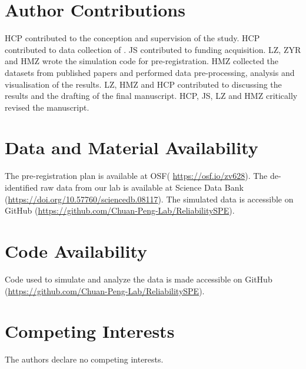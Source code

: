 \documentclass[sn-apa]{sn-jnl}%
\theoremstyle{thmstyleone}%
\theoremstyle{thmstyletwo}%
\theoremstyle{thmstylethree}%
\begin{document}
\section*{Author Contributions}

HCP contributed to the conception and supervision of the study. HCP contributed to data collection of \textcite{hu2023data}. JS contributed to funding acquisition. LZ, ZYR and HMZ wrote the simulation code for pre-registration. HMZ collected the datasets from published papers and performed data pre-processing, analysis and visualisation of the results. LZ, HMZ and HCP contributed to discussing the results and the drafting of the final manuscript. HCP, JS, LZ and HMZ critically revised the manuscript.

\section*{Data and Material Availability}

The pre-registration plan is available at OSF( \url{https://osf.io/zv628}). The de-identified raw data from our lab is available at Science Data Bank (\url{https://doi.org/10.57760/sciencedb.08117}). The simulated data is accessible on GitHub (\url{https://github.com/Chuan-Peng-Lab/ReliabilitySPE}). 

\section*{Code Availability}

Code used to simulate and analyze the data is made accessible on GitHub (\url{https://github.com/Chuan-Peng-Lab/ReliabilitySPE}). 

\section*{Competing Interests}

The authors declare no competing interests.





\printbibliography
\end{document}

